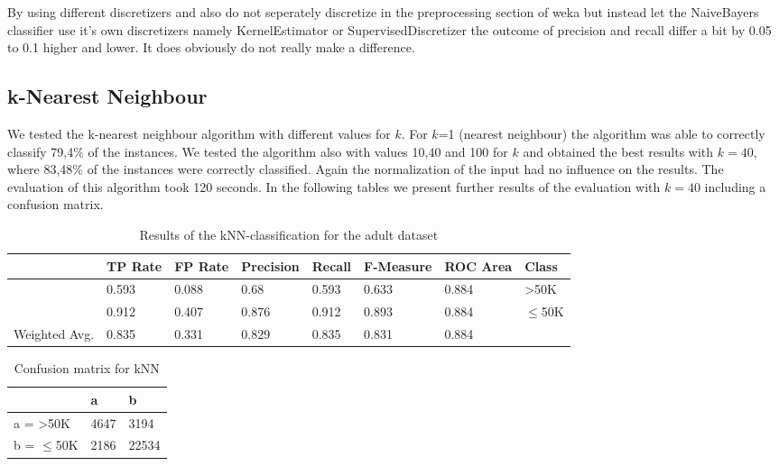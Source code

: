 \documentclass[paper=a4, fontsize=11pt]{scrartcl} %
\numberwithin{equation}{section} %
\numberwithin{figure}{section} %
\numberwithin{table}{section} %
\begin{document}
By using different discretizers and also do not seperately discretize in the preprocessing section of weka but instead let the NaiveBayers classifier use it's own discretizers namely KernelEstimator or SupervisedDiscretizer the outcome of precision and recall differ a bit by 0.05 to 0.1 higher and lower. It does obviously do not really make a difference.



\subsection{k-Nearest Neighbour}

We tested the k-nearest neighbour algorithm with different values for $k$. For $k$=1 (nearest neighbour) the algorithm was able to correctly classify 79,4\% of the instances. We tested the algorithm also with values 10,40 and 100 for $k$ and obtained the best results with $k=40$, where 83,48\% of the instances were correctly classified. Again the normalization of the input had no influence on the results. The evaluation of this algorithm took 120 seconds. In the following tables we present further results of the evaluation with $k=40$ including a confusion matrix.

\begin{table}[h]
\centering
\begin{tabular}{|llllllll|}
	\hline
									&TP Rate   &FP Rate   &Precision   &Recall  &F-Measure &ROC Area  	&Class\\
	\hline
									&0.593     &0.088      &0.68      &0.593     &0.633    &0.884    		&>50K\\
									&0.912     &0.407      &0.876     &0.912     &0.893    &0.884    		&$\leq$50K\\
  \hline
	Weighted Avg.   &0.835     &0.331      &0.829     &0.835     &0.831    &0.884 \\
	\hline
\end{tabular}
\caption{Results of the kNN-classification for the adult dataset}
\end{table}

\vspace{6pt}

\begin{table}[h]
\centering
\begin{tabular}{|l|ll|}
	\hline
	 &              a    & b     \\
	\hline
    a = >50K      &	4647 & 3194  \\
    b = $\leq$50K & 2186 & 22534 \\
    \hline
\end{tabular}
\caption{Confusion matrix for kNN}
\end{table}
\end{document}
